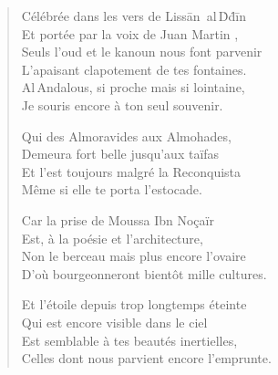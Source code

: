 \begin{verse}\quatrain\sizain
  Célébrée dans les vers de Lissān~al\,Ḋḋīn%
  \\  %
  Et portée par la voix de Juan {Martin}%
,\\ 
  Seuls l’oud et le kanoun%
\label{foot.kanoun} nous font parvenir\\ 
  L’apaisant clapotement de tes fontaines.\\ 
  Al\,Andalous, si proche mais si lointaine,\\ 
  Je souris encore à ton seul souvenir. %

  Qui des Almoravides aux Almohades,\\ 
  Demeura fort belle jusqu’aux taïfas\\ 
  Et l’est toujours malgré la Reconquista\\ 
  Même si elle te porta l’estocade. %

  Car la prise de  Moussa Ibn Noçaïr%
  \\ 
  Est, à la poésie et l’architecture,\\ 
  Non le berceau mais plus encore l’ovaire\\ 
  D’où bourgeonneront bientôt mille cultures. %

  Et l’étoile depuis trop longtemps éteinte\\ 
  Qui est encore visible dans le ciel\\ 
  Est semblable à tes beautés inertielles,\\ 
  Celles dont nous parvient encore l’emprunte. %


\end{verse}
